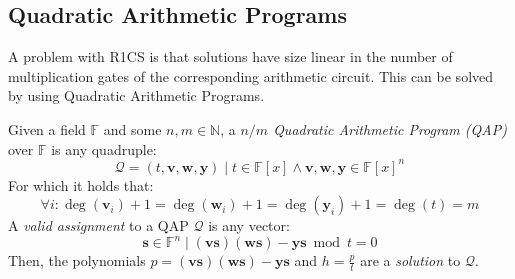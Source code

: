 \subsection{Quadratic Arithmetic Programs}
A problem with R1CS is that solutions have size linear in the number of multiplication gates of
the corresponding arithmetic circuit.
This can be solved by using Quadratic Arithmetic Programs.
\begin{definition}
	Given a field \(\mathbb{F}\) and some \(n,m \in \mathbb{N}\), a
	\emph{\(n/m\) Quadratic Arithmetic Program (QAP)} over \(\mathbb{F}\) is any quadruple:
	\[ \mathcal{Q} = \left(t, \bm{v}, \bm{w}, \bm{y}\right) \mid {t \in \mathbb{F}\left[x\right]}
		\land {\bm{v},\bm{w},\bm{y} \in {\mathbb{F}\left[x\right]}^n}\]
	For which it holds that:
	\[
		\forall i\colon \deg\left(\bm{v}_i\right)+1 = \deg\left(\bm{w}_i\right)+1 =
		\deg\left(\bm{y}_i\right)+1 = \deg\left(t\right) = m
	\]
	A \emph{valid assignment} to a QAP \(\mathcal{Q}\) is any vector:
	\[
		\bm{s} \in \mathbb{F}^n \mid \left(\bm{v}\bm{s}\right)\left(\bm{w}\bm{s}\right) -
		\bm{y}\bm{s} \bmod t = 0
	\]
	Then, the polynomials \(p = \left(\bm{v}\bm{s}\right)\left(\bm{w}\bm{s}\right) - \bm{y}\bm{s}\)
	and \(h = \frac{p}{t}\) are a \emph{solution} to \(\mathcal{Q}\).
\end{definition}

